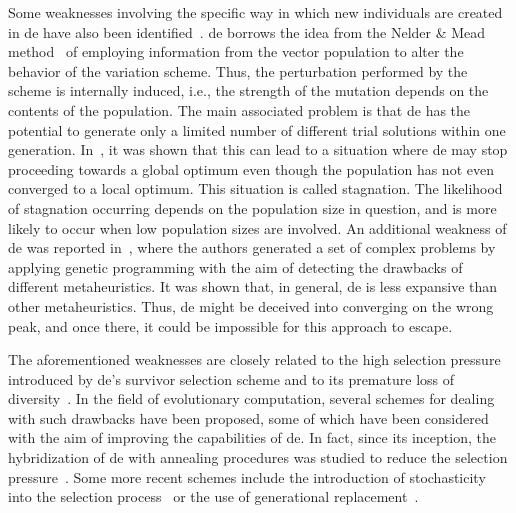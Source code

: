 \documentclass[preprint,3p]{elsarticle}
\newcommand{\DE}{{\sc de}}
\begin{document}
Some weaknesses involving the specific way in which new individuals are created in \DE{} have also been identified~\cite{Lampinen:00,Langdon:07}.
%
\DE{} borrows the idea from the Nelder \& Mead method~\cite{Nelder:65} of employing information from the vector population
to alter the behavior of the variation scheme.
%
Thus, the perturbation performed by the scheme is internally induced, i.e., the strength of the mutation depends on the contents of the population.
%
The main associated problem is that \DE{} has the potential to generate only a limited number of different trial solutions within one generation.
%
In~\cite{Lampinen:00}, it was shown that this can lead to a situation where \DE{} may stop proceeding towards a global optimum even though the population
has not even converged to a local optimum.
%
This situation is called stagnation.
%
The likelihood of stagnation occurring depends on the population size in question, and is more likely to occur
when low population sizes are involved.
%
%
%
%
An additional weakness of \DE{} was reported in~\cite{Langdon:07}, where the authors generated a set of complex problems by applying
genetic programming with the aim of detecting the drawbacks of different metaheuristics.
%
It was shown that, in general, \DE{} is less expansive than other metaheuristics.
%
Thus, \DE{} might be deceived into converging on the wrong peak, and once there, it could be impossible for this approach to escape.

The aforementioned weaknesses are closely related to the high selection pressure introduced by \DE{}'s survivor selection scheme
and to its premature loss of diversity~\cite{Angela:08}.
%
In the field of evolutionary computation, several schemes for dealing with such drawbacks have been proposed,
some of which have been considered with the aim of improving the capabilities of \DE{}.
%
In fact, since its inception, the hybridization of \DE{} with annealing procedures was studied to reduce the selection pressure~\cite{Price:05}.
%
Some more recent schemes include the introduction of stochasticity into the selection process~\cite{Angela:08}
or the use of generational replacement~\cite{Arabas:11}.
%
%
%
%
\end{document}
